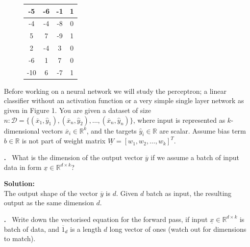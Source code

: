 \documentclass[12pt]{article}
\newcounter{problem}
\newcounter{solution}
\newcommand\Problem{%
	\stepcounter{problem}%
	\textbf{\theproblem.}~%
	\setcounter{solution}{0}%
}
\newcommand\Solution{%
	\textbf{Solution:}\\%
}
\begin{document}
\begin{figure}[h!]
\begin{minipage}[c]{.49\textwidth}
\begin{tabular}{|c|c|c|c|}
				-5         & -6         & -1         & 1                           \\\hline
				-4         & -4         & -8         & 0                           \\\hline
				5          & 7          & -9         & 1                           \\\hline
				2          & -4         & 3          & 0                           \\\hline
				-6         & 1          & 7          & 0                           \\\hline
				-10        & 6          & -7         & 1                          \\\hline
			\end{tabular}
			\label{tab:traind-dataset}
	
	\end{minipage}
\end{figure}

Before working on a neural network we will study the perceptron; a linear classifier
without an activation function or a very simple single layer network as given in Figure 1.
You are given a dataset of size $n: \mathcal{D} = \{(\overline{x}_1 ,\hat{y}_1),(\overline{x}_n ,\hat{y}_2),\dots , (\overline{x}_n ,\hat{y}_n)\}$, where input is represented as $k$-dimensional vectors $\overline{x}_i \in \mathbb{R}^k$, and the targets $\hat{y}_i \in \mathbb{R}$ are scalar. Assume bias term $b \in \mathbb{R}$ is not part of weight matrix $\underline{W} = [w_1,w_2,\dots,w_k]^T$.

\newpage

\Problem{What is the dimension of the output vector $\overline{y}$ if we assume a batch of input data in form $\underline{x} \in \mathbb{R}^{d \times k}$?}

\Solution{The output shape of the vector $\overline{y}$ is $d$. Given $d$ batch as input, the resulting output as the same dimension $d$.}

\Problem{Write down the vectorised equation for the forward pass, if input $\underline{x} \in \mathbb{R}^{d \times k}$ is batch of data, and $\overline{1}_d$ is a length $d$ long vector of ones (watch out for dimensions to match).}
\end{document}
